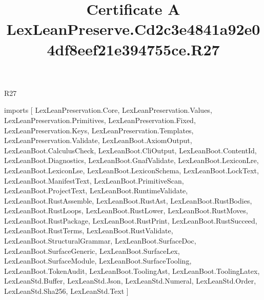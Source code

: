 \begin{lexlean}{R27}
\title{Certificate A LexLeanPreserve.Cd2c3e4841a92e04df8eef21e394755ce.R27}
\begin{coremodule}
imports [
  LexLeanPreservation.Core,
  LexLeanPreservation.Values,
  LexLeanPreservation.Primitives,
  LexLeanPreservation.Fixed,
  LexLeanPreservation.Keys,
  LexLeanPreservation.Templates,
  LexLeanPreservation.Validate,
  LexLeanBoot.AxiomOutput,
  LexLeanBoot.CalculusCheck,
  LexLeanBoot.CliOutput,
  LexLeanBoot.ContentId,
  LexLeanBoot.Diagnostics,
  LexLeanBoot.GnafValidate,
  LexLeanBoot.LexiconLre,
  LexLeanBoot.LexiconLse,
  LexLeanBoot.LexiconSchema,
  LexLeanBoot.LockText,
  LexLeanBoot.ManifestText,
  LexLeanBoot.PrimitiveScan,
  LexLeanBoot.ProjectText,
  LexLeanBoot.RuntimeValidate,
  LexLeanBoot.RustAssemble,
  LexLeanBoot.RustAst,
  LexLeanBoot.RustBodies,
  LexLeanBoot.RustLoops,
  LexLeanBoot.RustLower,
  LexLeanBoot.RustMoves,
  LexLeanBoot.RustPackage,
  LexLeanBoot.RustPrint,
  LexLeanBoot.RustSucceed,
  LexLeanBoot.RustTerms,
  LexLeanBoot.RustValidate,
  LexLeanBoot.StructuralGrammar,
  LexLeanBoot.SurfaceDoc,
  LexLeanBoot.SurfaceGeneric,
  LexLeanBoot.SurfaceLex,
  LexLeanBoot.SurfaceModule,
  LexLeanBoot.SurfaceTooling,
  LexLeanBoot.TokenAudit,
  LexLeanBoot.ToolingAst,
  LexLeanBoot.ToolingLatex,
  LexLeanStd.Buffer,
  LexLeanStd.Json,
  LexLeanStd.Numeral,
  LexLeanStd.Order,
  LexLeanStd.Sha256,
  LexLeanStd.Text
]


\end{coremodule}
\end{lexlean}
